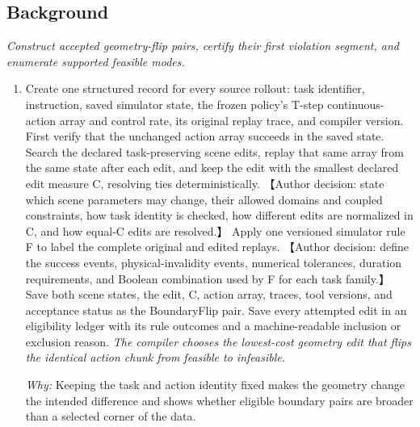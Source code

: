 \documentclass[10pt,a4paper]{article}
\begin{document}
\subsection*{Background}
\emph{Construct accepted geometry-flip pairs, certify their first violation segment, and enumerate supported feasible modes.}
\begin{enumerate}[leftmargin=*,start=1]
  \item Create one structured record for every source rollout: task identifier, instruction, saved simulator state, the frozen policy's T-step continuous-action array and control rate, its original replay trace, and compiler version. First verify that the unchanged action array succeeds in the saved state. Search the declared task-preserving scene edits, replay that same array from the same state after each edit, and keep the edit with the smallest declared edit measure C, resolving ties deterministically. 【Author decision: state which scene parameters may change, their allowed domains and coupled constraints, how task identity is checked, how different edits are normalized in C, and how equal-C edits are resolved.】 Apply one versioned simulator rule F to label the complete original and edited replays. 【Author decision: define the success events, physical-invalidity events, numerical tolerances, duration requirements, and Boolean combination used by F for each task family.】 Save both scene states, the edit, C, action array, traces, tool versions, and acceptance status as the BoundaryFlip pair. Save every attempted edit in an eligibility ledger with its rule outcomes and a machine-readable inclusion or exclusion reason.
\noindent\emph{The compiler chooses the lowest-cost geometry edit that flips the identical action chunk from feasible to infeasible.}
\par{}
\par\emph{Why:} Keeping the task and action identity fixed makes the geometry change the intended difference and shows whether eligible boundary pairs are broader than a selected corner of the data.

\end{enumerate}
\end{document}
